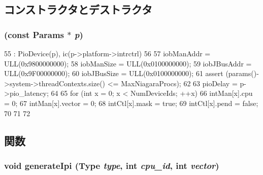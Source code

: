 \subsection{コンストラクタとデストラクタ}
\hypertarget{classIob_a6b17dd15918c015374327e292dca92f3}{
\subsubsection[{Iob}]{ (const {\bf Params} $\ast$ {\em p})}}
\label{classIob_a6b17dd15918c015374327e292dca92f3}



\begin{DoxyCode}
55     : PioDevice(p), ic(p->platform->intrctrl)
56 {
57     iobManAddr = ULL(0x9800000000);
58     iobManSize = ULL(0x0100000000);
59     iobJBusAddr = ULL(0x9F00000000);
60     iobJBusSize = ULL(0x0100000000);
61     assert (params()->system->threadContexts.size() <= MaxNiagaraProcs);
62 
63     pioDelay = p->pio_latency;
64 
65     for (int x = 0; x < NumDeviceIds; ++x) {
66         intMan[x].cpu = 0;
67         intMan[x].vector = 0;
68         intCtl[x].mask = true;
69         intCtl[x].pend = false;
70     }
71 
72 }
\end{DoxyCode}


\subsection{関数}
\hypertarget{classIob_a3c0c6341079a8c15a7903e450c4dc1e5}{
\subsubsection[{generateIpi}]{\setlength{\rightskip}{0pt plus 5cm}void generateIpi ({\bf Type} {\em type}, \/  int {\em cpu\_\-id}, \/  int {\em vector})}}
\label{classIob_a3c0c6341079a8c15a7903e450c4dc1e5}



